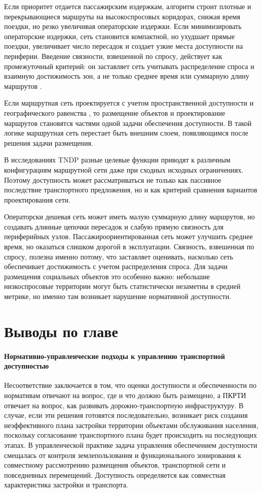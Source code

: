 Если приоритет отдается пассажирским издержкам, алгоритм строит плотные и перекрывающиеся маршруты на высокоспросовых коридорах, снижая время поездки, но резко увеличивая операторские издержки. Если минимизировать операторские издержки, сеть становится компактной, но ухудшает прямые поездки, увеличивает число пересадок и создает узкие места доступности на периферии. Введение связности, взвешенной по спросу, действует как промежуточный критерий: он заставляет сеть учитывать распределение спроса и взаимную достижимость зон, а не только среднее время или суммарную длину маршрутов \cite{holliday2024tndpLearning}.

Если маршрутная сеть проектируется с учетом пространственной доступности и географического равенства \cite{wang2024spatialEquityTndp}, то размещение объектов и проектирование маршрутов становятся частями одной задачи обеспечения доступности. В такой логике маршрутная сеть перестает быть внешним слоем, появляющимся после решения задачи размещения.

В исследованиях TNDP разные целевые функции приводят к различным конфигурациям маршрутной сети даже при сходных исходных ограничениях. Поэтому доступность может рассматриваться не только как пассивное последствие транспортного предложения, но и как критерий сравнения вариантов проектирования сети.

Операторски дешевая сеть может иметь малую суммарную длину маршрутов, но создавать длинные цепочки пересадок и слабую прямую связность для периферийных узлов. Пассажироориентированная сеть может улучшить среднее время, но оказаться слишком дорогой в эксплуатации. Связность, взвешенная по спросу, полезна именно потому, что заставляет оценивать, насколько сеть обеспечивает достижимость с учетом распределения спроса. Для задачи размещения социальных объектов это особенно важно: небольшие низкоспросовые территории могут быть статистически незаметны в средней метрике, но именно там возникает нарушение нормативной доступности.

\newpage
\section{Выводы по главе}
\label{sec:chapter1-conclusions}

\paragraph*{Нормативно-управленческие подходы к управлению транспортной доступностью}
Несоответствие заключается в том, что оценки доступности и обеспеченности по нормативам отвечают на вопрос, где и что должно быть размещено, а ПКРТИ отвечает на вопрос, как развивать дорожно-транспортную инфраструктуру. В случае, если эти решения готовятся последовательно, возникает риск создания неэффективного плана застройки территории объектами обслуживания населения, поскольку согласование транспортного плана будет происходить на последующих этапах. В управленческой практике задача управления обеспечением доступности смещалась от контроля землепользования и функционального зонирования к совместному рассмотрению размещения объектов, транспортной сети и повседневных перемещений. Доступность определяется как совместная характеристика застройки и транспорта.

